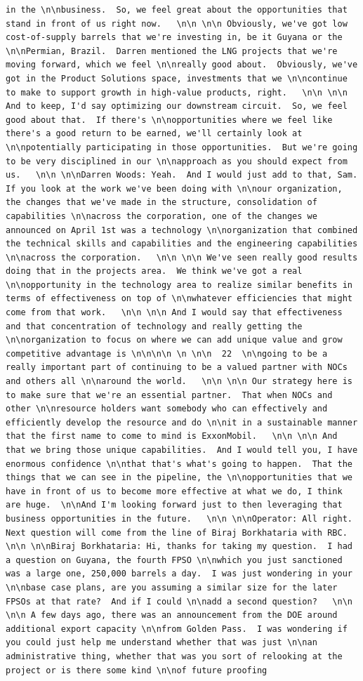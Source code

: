 \documentclass[
  letterpaper,
  DIV=11,
  numbers=noendperiod]{scrreprt}
\begin{document}
\begin{verbatim}
in the \n\nbusiness.  So, we feel great about the opportunities that stand in front of us right now.   \n\n \n\n Obviously, we've got low cost-of-supply barrels that we're investing in, be it Guyana or the \n\nPermian, Brazil.  Darren mentioned the LNG projects that we're moving forward, which we feel \n\nreally good about.  Obviously, we've got in the Product Solutions space, investments that we \n\ncontinue to make to support growth in high-value products, right.   \n\n \n\n And to keep, I'd say optimizing our downstream circuit.  So, we feel good about that.  If there's \n\nopportunities where we feel like there's a good return to be earned, we'll certainly look at \n\npotentially participating in those opportunities.  But we're going to be very disciplined in our \n\napproach as you should expect from us.   \n\n \n\nDarren Woods: Yeah.  And I would just add to that, Sam.  If you look at the work we've been doing with \n\nour organization, the changes that we've made in the structure, consolidation of capabilities \n\nacross the corporation, one of the changes we announced on April 1st was a technology \n\norganization that combined the technical skills and capabilities and the engineering capabilities \n\nacross the corporation.   \n\n \n\n We've seen really good results doing that in the projects area.  We think we've got a real \n\nopportunity in the technology area to realize similar benefits in terms of effectiveness on top of \n\nwhatever efficiencies that might come from that work.   \n\n \n\n And I would say that effectiveness and that concentration of technology and really getting the \n\norganization to focus on where we can add unique value and grow competitive advantage is \n\n\n\n \n \n\n  22  \n\ngoing to be a really important part of continuing to be a valued partner with NOCs and others all \n\naround the world.   \n\n \n\n Our strategy here is to make sure that we're an essential partner.  That when NOCs and other \n\nresource holders want somebody who can effectively and efficiently develop the resource and do \n\nit in a sustainable manner that the first name to come to mind is ExxonMobil.   \n\n \n\n And that we bring those unique capabilities.  And I would tell you, I have enormous confidence \n\nthat that's what's going to happen.  That the things that we can see in the pipeline, the \n\nopportunities that we have in front of us to become more effective at what we do, I think are huge.  \n\nAnd I'm looking forward just to then leveraging that business opportunities in the future.   \n\n \n\nOperator: All right.  Next question will come from the line of Biraj Borkhataria with RBC.   \n\n \n\nBiraj Borkhataria: Hi, thanks for taking my question.  I had a question on Guyana, the fourth FPSO \n\nwhich you just sanctioned was a large one, 250,000 barrels a day.  I was just wondering in your \n\nbase case plans, are you assuming a similar size for the later FPSOs at that rate?  And if I could \n\nadd a second question?   \n\n \n\n A few days ago, there was an announcement from the DOE around additional export capacity \n\nfrom Golden Pass.  I was wondering if you could just help me understand whether that was just \n\nan administrative thing, whether that was you sort of relooking at the project or is there some kind \n\nof future proofing 
\end{verbatim}
\end{document}
